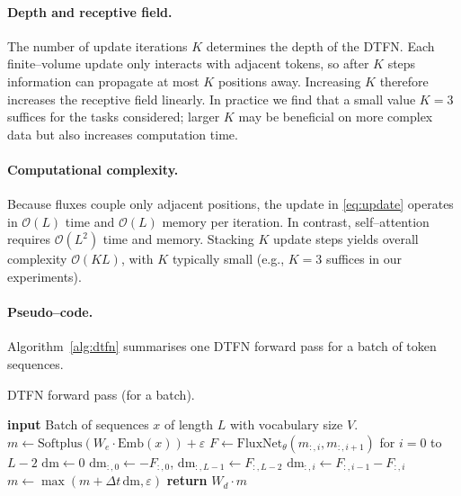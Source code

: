 \documentclass[10pt]{article}
\begin{document}
\paragraph{Depth and receptive field.}  The number of update iterations $K$
determines the depth of the DTFN.  Each finite--volume update only
interacts with adjacent tokens, so after $K$ steps information can
propagate at most $K$ positions away.  Increasing $K$ therefore
increases the receptive field linearly.  In practice we find that a small
value $K=3$ suffices for the tasks considered; larger $K$ may be
beneficial on more complex data but also increases computation time.

\paragraph{Computational complexity.}  Because fluxes couple only
adjacent positions, the update in \eqref{eq:update} operates in
$\mathcal{O}(L)$ time and $\mathcal{O}(L)$ memory per iteration.  In
contrast, self--attention requires $\mathcal{O}(L^2)$ time and memory.
Stacking $K$ update steps yields overall complexity $\mathcal{O}(K L)$,
with $K$ typically small (e.g., $K=3$ suffices in our experiments).

\paragraph{Pseudo--code.}  Algorithm~\ref{alg:dtfn} summarises one DTFN
forward pass for a batch of token sequences.

\begin{algorithm}[t]
  \caption{DTFN forward pass (for a batch).\label{alg:dtfn}}
  \begin{algorithmic}[1]
    \State \textbf{input} Batch of sequences $x$ of length $L$ with
    vocabulary size $V$.
    \State $m \gets \mathrm{Softplus}(W_e \cdot \mathrm{Emb}(x)) + \varepsilon$ 
      \State $F \gets \mathrm{FluxNet}_\theta(m_{:,i}, m_{:,i+1})$ for $i=0$ to $L-2$ 
      \State $\mathrm{dm} \gets 0$ 
      \State $\mathrm{dm}_{:,0} \gets -F_{:,0}$, $\mathrm{dm}_{:,L-1} \gets F_{:,L-2}$ 
        \State $\mathrm{dm}_{:,i} \gets F_{:,i-1} - F_{:,i}$
      \EndFor
      \State $m \gets \max(m + \Delta t\,\mathrm{dm},\varepsilon)$
    \EndFor
    \State \textbf{return} $W_d \cdot m$ 
  \end{algorithmic}
\end{algorithm}
\end{document}

